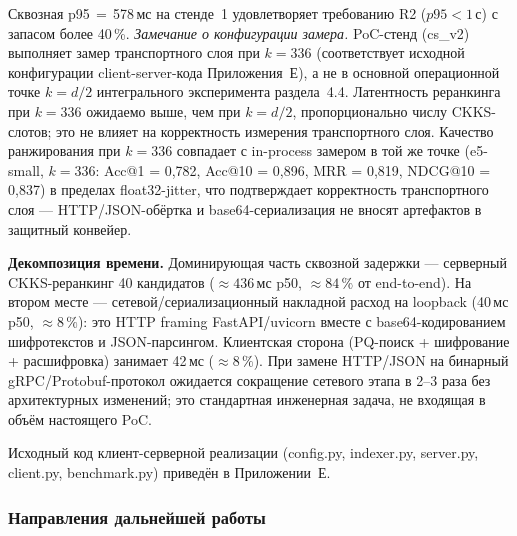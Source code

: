\documentclass[a4paper, 12pt, oneside, openany]{article}
\begin{document}
Сквозная p95\,$=$\,578\,мс на стенде~1 удовлетворяет требованию R2 ($p95 < 1$\,с) с запасом более 40\,\%. \emph{Замечание о конфигурации замера.} PoC-стенд (cs\_v2) выполняет замер транспортного слоя при $k = 336$ (соответствует исходной конфигурации client-server-кода Приложения~Е), а не в основной операционной точке $k = d/2$ интегрального эксперимента раздела~4.4. Латентность реранкинга при $k = 336$ ожидаемо выше, чем при $k = d/2$, пропорционально числу CKKS-слотов; это не влияет на корректность измерения транспортного слоя. Качество ранжирования при $k = 336$ совпадает с in-process замером в той же точке (e5-small, $k = 336$: Acc@1 = 0,782, Acc@10 = 0,896, MRR = 0,819, NDCG@10 = 0,837) в пределах float32-jitter, что подтверждает корректность транспортного слоя --- HTTP/JSON-обёртка и base64-сериализация не вносят артефактов в защитный конвейер.

\textbf{Декомпозиция времени.} Доминирующая часть сквозной задержки --- серверный CKKS-реранкинг 40 кандидатов ($\approx 436$\,мс p50, $\approx 84\,\%$ от end-to-end). На втором месте --- сетевой/сериализационный накладной расход на loopback (40\,мс p50, $\approx 8\,\%$): это HTTP framing FastAPI/uvicorn вместе с base64-кодированием шифротекстов и JSON-парсингом. Клиентская сторона (PQ-поиск + шифрование + расшифровка) занимает 42\,мс ($\approx 8\,\%$). При замене HTTP/JSON на бинарный gRPC/Protobuf-протокол ожидается сокращение сетевого этапа в 2--3 раза без архитектурных изменений; это стандартная инженерная задача, не входящая в объём настоящего PoC.



Исходный код клиент-серверной реализации (config.py, indexer.py, server.py, client.py, benchmark.py) приведён в Приложении~Е.


\subsubsection{Направления дальнейшей работы}
\end{document}

